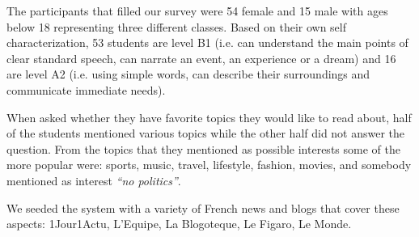 The participants that filled our survey were 54 female and 15 male with ages below 18 representing three different classes. Based on their own self characterization, 53 students are level B1 (i.e. can understand the main points of clear standard speech, can narrate an event, an experience or a dream) and 16 are level A2 (i.e. using simple words, can describe their surroundings and communicate immediate needs). 


When asked whether they have favorite topics they would like to read about, half of the students mentioned various topics while the other half did not answer the question. From the topics that they mentioned as possible interests some of the more popular were: sports, music, travel, lifestyle, fashion, movies, and somebody mentioned as interest {\em ``no politics''}.

We seeded the system with a variety of French news and blogs that cover these aspects: 1Jour1Actu, L'Equipe, La Blogoteque, Le Figaro, Le Monde. 











